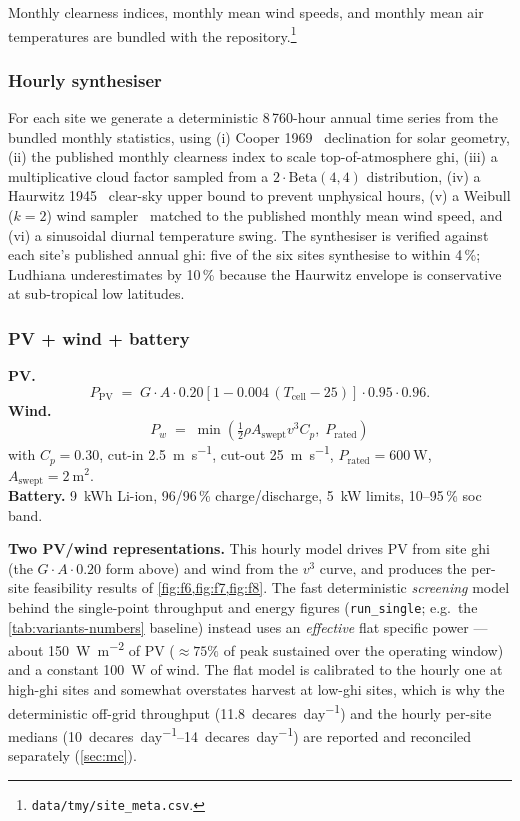 \documentclass[11pt,a4paper]{article}
\begin{document}
Monthly clearness indices, monthly mean wind speeds, and monthly mean air temperatures are bundled with the repository.\footnote{\texttt{data/tmy/site\_meta.csv}.}

\subsubsection{Hourly synthesiser}\label{sec:synth}

For each site we generate a deterministic 8\,760-hour annual time series from the bundled monthly statistics, using (i) Cooper 1969~\cite{cooper1969absorption} declination for solar geometry, (ii) the published monthly clearness index to scale top-of-atmosphere \gls{ghi}, (iii) a multiplicative cloud factor sampled from a $2 \cdot \mathrm{Beta}(4,4)$ distribution, (iv) a Haurwitz 1945~\cite{haurwitz1945insolation} clear-sky upper bound to prevent unphysical hours, (v) a Weibull ($k=2$) wind sampler~\cite{justus1978winds} matched to the published monthly mean wind speed, and (vi) a sinusoidal diurnal temperature swing. The synthesiser is verified against each site's published annual \gls{ghi}: five of the six sites synthesise to within 4\,\%; Ludhiana underestimates by 10\,\% because the Haurwitz envelope is conservative at sub-tropical low latitudes.

\subsubsection{PV + wind + battery}\label{sec:pvwindbat}

\textbf{PV.} \[ P_{\text{PV}} \;=\; G \cdot A \cdot 0.20\!\left[1 - 0.004\,(T_{\text{cell}} - 25)\right] \cdot 0.95 \cdot 0.96. \]
\textbf{Wind.} \[ P_w \;=\; \min\!\left(\tfrac{1}{2}\rho A_{\text{swept}} v^{3} C_p,\; P_{\text{rated}}\right) \] with $C_p = 0.30$, cut-in \SI{2.5}{\meter\per\second}, cut-out \SI{25}{\meter\per\second}, $P_{\text{rated}} = \SI{600}{\watt}$, $A_{\text{swept}} = \SI{2}{\meter\squared}$.\\
\textbf{Battery.} \SI{9}{\kWh} Li-ion, 96/96\,\% charge/discharge, \SI{5}{\kilo\watt} limits, 10--95\,\% \gls{soc} band.

\textbf{Two PV/wind representations.} This hourly model drives PV from site \gls{ghi} (the $G\cdot A\cdot 0.20$ form above) and wind from the $v^3$ curve, and produces the per-site feasibility results of \cref{fig:f6,fig:f7,fig:f8}. The fast deterministic \emph{screening} model behind the single-point throughput and energy figures (\texttt{run\_single}; e.g.\ the \cref{tab:variants-numbers} baseline) instead uses an \emph{effective} flat specific power --- about \SI{150}{\watt\per\meter\squared} of PV (${\approx}75\%$ of peak sustained over the operating window) and a constant \SI{100}{\watt} of wind. The flat model is calibrated to the hourly one at high-\gls{ghi} sites and somewhat overstates harvest at low-\gls{ghi} sites, which is why the deterministic off-grid throughput (\SI{11.8}{decares\per day}) and the hourly per-site medians (\SIrange{10}{14}{decares\per day}) are reported and reconciled separately (\cref{sec:mc}).
\end{document}
